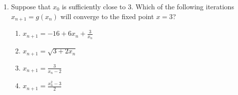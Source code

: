 \documentclass[journal]{IEEEtran}
\numberwithin{figure}{enumi}
\begin{document}
\begin{enumerate}
\item Suppose that \( x_0 \) is sufficiently close to 3. Which of the following iterations \( x_{n+1} = g(x_n) \) will converge to the fixed point \( x = 3 \)?
\begin{enumerate}
    \item $x_{n+1} = -16 + 6x_n + \frac{3}{x_n}$
    
    \item $x_{n+1} = \sqrt{3 + 2x_n}$
    
    \item $x_{n+1} = \frac{3}{x_n - 2}$
    
    \item $x_{n+1} = \frac{x_n^2 - 3}{2}$
\end{enumerate}




\end{enumerate}
\end{document}
